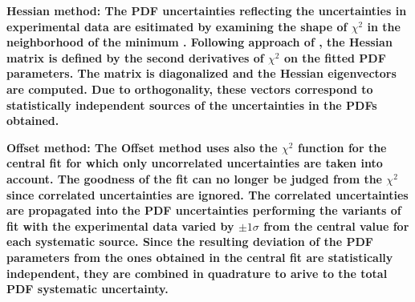 \begin{description}
\item \bf{Hessian method:} \rm
The PDF uncertainties reflecting the uncertainties in experimental data are esitimated by 
examining the shape of $\chi^2$ in the neighborhood of the minimum \cite{Pumplin:2001ct}.
Following approach of \cite{Pumplin:2001ct}, the Hessian matrix is defined by the second 
derivatives of $\chi^2$ on the fitted PDF parameters. The matrix is diagonalized and the 
Hessian eigenvectors are computed. 
Due to orthogonality, these vectors correspond to statistically independent sources of the
uncertainties in the PDFs obtained.
%

\item \bf{Offset  method:} \rm
The Offset method \cite{Botje:2001fx} uses
%
also the $\chi^2$ function for the central fit for which only
uncorrelated uncertainties are taken into account. 
The goodness of the fit can no longer be judged from the $\chi^2$ since correlated uncertainties are ignored. 
The correlated uncertainties are propagated into the PDF uncertainties performing the variants 
of fit with the experimental data varied by $\pm 1 \sigma$ from the central value  
for each systematic source.
Since the resulting deviation of the PDF parameters from the ones obtained in the central 
fit are statistically independent, they are combined in quadrature to arive to the total 
PDF systematic uncertainty.
%


\end{description}

